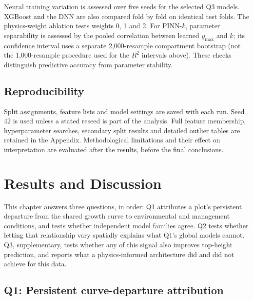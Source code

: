 \documentclass[logo,msc,ai]{infthesis}           %
\begin{document}
Neural training variation is assessed over five seeds for the selected Q3 models. XGBoost and the
DNN are also compared fold by fold on identical test folds. The physics-weight ablation tests
weights 0, 1 and 2. For PINN-$k$, parameter separability is assessed by the pooled correlation
between learned $y_{\max}$ and $k$; its confidence interval uses a separate 2,000-resample compartment
bootstrap (not the 1,000-resample procedure used for the $R^2$ intervals above). These checks distinguish predictive accuracy from parameter stability.

\section{Reproducibility}

Split assignments, feature lists and model settings are saved with each run. Seed 42 is used unless
a stated reseed is part of the analysis. Full feature membership, hyperparameter searches,
secondary split results and detailed outlier tables are retained in the Appendix. Methodological
limitations and their effect on interpretation are evaluated after the results, before the final
conclusions.

\chapter{Results and Discussion} \label{ch:results}

This chapter answers three questions, in order: Q1 attributes a plot's persistent
departure from the shared growth curve to environmental and management conditions,
and tests whether independent model families agree. Q2 tests whether letting that
relationship vary spatially explains what Q1's global models cannot. Q3, supplementary,
tests whether any of this signal also improves top-height prediction, and reports what
a physics-informed architecture did and did not achieve for this data.

\section{Q1: Persistent curve-departure attribution}
\label{sec:results-rq2}
\label{sec:results-q1}
\end{document}
